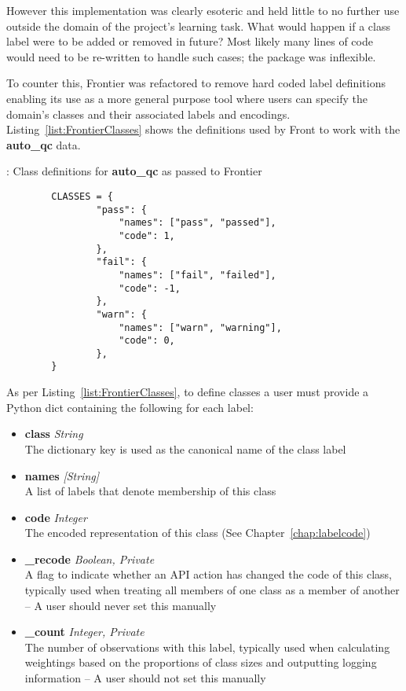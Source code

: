 However this implementation was clearly esoteric and held little to no further
use outside the domain of the project's learning task. What would happen if a
class label were to be added or removed in future? Most likely many lines of
code would need to be re-written to handle such cases; the package was
inflexible.

To counter this, Frontier was refactored to remove hard coded label definitions
enabling its use as a more general purpose tool where users can specify the
domain's classes and their associated labels and encodings.
Listing~\ref{list:FrontierClasses} shows the definitions used by Front to work
with the \textbf{auto\_qc} data.

\begin{listing}[H]
    \caption[FrontierClasses]{: Class definitions for \textbf{auto\_qc} as passed to Frontier}
    \label{list:FrontierClasses}
    \begin{verbatim}
        CLASSES = {
                "pass": {
                    "names": ["pass", "passed"],
                    "code": 1,
                },
                "fail": {
                    "names": ["fail", "failed"],
                    "code": -1,
                },
                "warn": {
                    "names": ["warn", "warning"],
                    "code": 0,
                },
        }
    \end{verbatim}
\end{listing}

As per Listing~\ref{list:FrontierClasses}, to define classes a user must provide
a Python dict containing the following for each label:

\begin{itemize}
    \item \textbf{class} \textit{String}\hfill\\
        The dictionary key is used as the canonical name of the class label
    \item \textbf{names} \textit{[String]}\hfill\\
        A list of labels that denote membership of this class
    \item \textbf{code} \textit{Integer}\hfill\\
        The encoded representation of this class (See Chapter~\ref{chap:labelcode})
    \item \textbf{\_recode} \textit{Boolean, Private}\hfill\\
        A flag to indicate whether an API action has changed the code of this
        class, typically used when treating all members of one class as a member
        of another -- A user should never set this manually
    \item \textbf{\_count} \textit{Integer, Private}\hfill\\
        The number of observations with this label, typically used when
        calculating weightings based on the proportions of class sizes and
        outputting logging information -- A user should not set this manually
\end{itemize}

